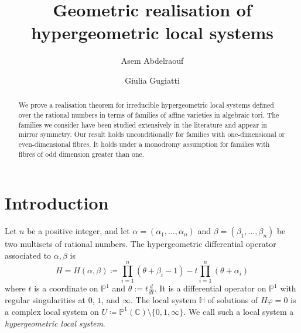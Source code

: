 \documentclass[11pt, reqno]{amsart}
\theoremstyle{plain}
\theoremstyle{definition}
\newcommand{\PP}{\mathbb{P}}
\newcommand{\HH}{\mathbb{H}}
\begin{document}
\title{Geometric realisation of hypergeometric local systems}

\author[A. Abdelraouf]{Asem Abdelraouf}
\address{AA: Kyiv School of Economics, Mykoly Shpaka St, 3, Kyiv, Ukraine, 02000} 

\author[G. Gugiatti]{Giulia Gugiatti}
\address{GG: School of Mathematics, University of Edinburgh, Edinburgh EH9 3FD, United Kingdom} 


\keywords{}

\begin{abstract} 
We prove a realisation theorem for irreducible hypergeometric local systems defined over the rational numbers in terms of families of affine varieties in algebraic tori.
The families we consider have been studied extensively in the literature and appear in mirror symmetry. 
Our result holds unconditionally for families with one-dimensional or even-dimensional fibres. It holds under a monodromy assumption for families with fibres of odd dimension greater than one.
\end{abstract}
\maketitle

\setcounter{tocdepth}{1}
\tableofcontents
\section{Introduction}
Let $n$ be a positive integer, and let $\alpha=(\alpha_1,\dots,\alpha_n)$ and $\beta=(\beta_1,\dots,\beta_n)$ be two multisets of rational numbers. The hypergeometric differential operator associated to $\alpha,\beta$ is 
\begin{equation}
H=H(\alpha,\beta) \coloneqq \prod_{i=1}^n (\theta+\beta_i -1) - t \prod_{i=1}^n (\theta+\alpha_i)
\end{equation}
where $t$ is a coordinate on $\PP^1$ and $\theta:= t\frac{d}{dt}$. It is a differential operator on $\mathbb{P}^1$ with regular singularities at $0$, $1$, and $\infty$. The local system $\HH$ of solutions of $H \varphi=0$ is a complex local system on $U \coloneqq \mathbb{P}^{1}(\mathbb{C}) \setminus\{0,1, \infty\}$. We call such a local system a \emph{hypergeometric local system}. 
\end{document}
